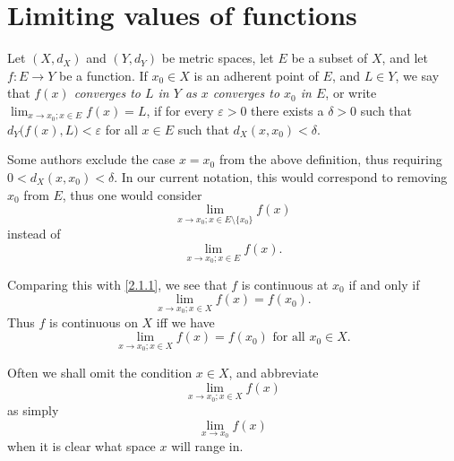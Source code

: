 \section{Limiting values of functions}\label{sec:3.1}

\begin{defn}\label{3.1.1}
  Let \((X, d_X)\) and \((Y, d_Y)\) be metric spaces, let \(E\) be a subset of \(X\), and let \(f : E \to Y\) be a function.
  If \(x_0 \in X\) is an adherent point of \(E\), and \(L \in Y\), we say that \emph{\(f(x)\) converges to \(L\) in \(Y\) as \(x\) converges to \(x_0\) in \(E\)}, or write \(\lim_{x \to x_0 ; x \in E} f(x) = L\), if for every \(\varepsilon > 0\) there exists a \(\delta > 0\) such that \(d_Y\big(f(x), L\big) < \varepsilon\) for all \(x \in E\) such that \(d_X(x, x_0) < \delta\).
\end{defn}

\begin{rmk}\label{3.1.2}
  Some authors exclude the case \(x = x_0\) from the above definition, thus requiring \(0 < d_X(x, x_0) < \delta\).
  In our current notation, this would correspond to removing \(x_0\) from \(E\), thus one would consider
  \[
    \lim_{x \to x_0 ; x \in E \setminus \{x_0\}} f(x)
  \]
  instead of
  \[
    \lim_{x \to x_0 ; x \in E} f(x).
  \]
\end{rmk}

\begin{note}
  Comparing this with \cref{2.1.1}, we see that \(f\) is continuous at \(x_0\) if and only if
  \[
    \lim_{x \to x_0 ; x \in X} f(x) = f(x_0).
  \]
  Thus \(f\) is continuous on \(X\) iff we have
  \[
    \lim_{x \to x_0 ; x \in X} f(x) = f(x_0) \text{ for all } x_0 \in X.
  \]
\end{note}

\setcounter{thm}{3}
\begin{rmk}\label{3.1.4}
  Often we shall omit the condition \(x \in X\), and abbreviate
  \[
    \lim_{x \to x_0 ; x \in X} f(x)
  \]
  as simply
  \[
    \lim_{x \to x_0} f(x)
  \]
  when it is clear what space \(x\) will range in.
\end{rmk}

